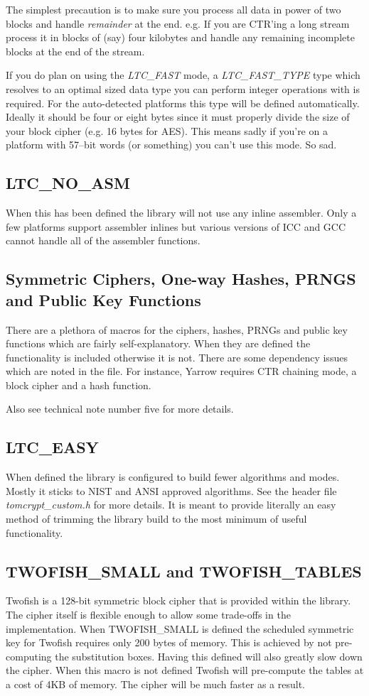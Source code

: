 \documentclass[synpaper]{book}
\begin{document}
The simplest precaution is to make sure you process all data in power of two blocks and handle \textit{remainder} at the end.  e.g. If you are
CTR'ing a long stream process it in blocks of (say) four kilobytes and handle any remaining incomplete blocks at the end of the stream.

If you do plan on using the \textit{LTC\_FAST} mode, a \textit{LTC\_FAST\_TYPE} type which resolves to an optimal sized
data type you can perform integer operations with is required.  For the auto-detected platforms this type will be defined automatically.  Ideally it should be four or eight bytes since it must properly divide the size
of your block cipher (e.g. 16 bytes for AES).  This means sadly if you're on a platform with 57--bit words (or something) you can't
use this mode.  So sad.

\subsection{LTC\_NO\_ASM}
When this has been defined the library will not use any inline assembler.  Only a few platforms support assembler inlines but various versions of ICC and GCC
cannot handle all of the assembler functions.

\subsection{Symmetric Ciphers, One-way Hashes, PRNGS and Public Key Functions}
There are a plethora of macros for the ciphers, hashes, PRNGs and public key functions which are fairly
self-explanatory.  When they are defined the functionality is included otherwise it is not.  There are some
dependency issues which are noted in the file.  For instance, Yarrow requires CTR chaining mode, a block
cipher and a hash function.

Also see technical note number five for more details.

\subsection{LTC\_EASY}
When defined the library is configured to build fewer algorithms and modes.  Mostly it sticks to NIST and ANSI approved algorithms.  See
the header file \textit{tomcrypt\_custom.h} for more details.  It is meant to provide literally an easy method of trimming the library
build to the most minimum of useful functionality.

\subsection{TWOFISH\_SMALL and TWOFISH\_TABLES}
Twofish is a 128-bit symmetric block cipher that is provided within the library.  The cipher itself is flexible enough
to allow some trade-offs in the implementation.  When TWOFISH\_SMALL is defined the scheduled symmetric key for Twofish
requires only 200 bytes of memory.  This is achieved by not pre-computing the substitution boxes.  Having this
defined will also greatly slow down the cipher.  When this macro is not defined Twofish will pre-compute the
tables at a cost of 4KB of memory.  The cipher will be much faster as a result.
\end{document}
